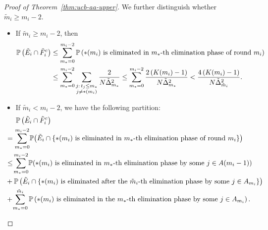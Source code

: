 \documentclass[
  12pt]{article}
\begin{document}
\begin{proof}[Proof of Theorem~\ref{thm:ucb-aa-upper}]
We further distinguish whether $\tilde{m}_i\geq m_i-2$.
\begin{itemize}
    \item If $\tilde{m}_i\geq m_i-2$, then
    \begin{align}
\mathbb{P}\left(\tilde{E}_i\cap\tilde{F}_i^c\right)&\leq  \sum_{m_*=0}^{m_i-2}\mathbb{P} \left(\text{$*(m_i)$ is eliminated in $m_*$-th elimination phase of round }m_i\right)\notag\\
&\leq \sum_{m_*=0}^{m_i-2}\sum_{\substack{j :\,t_j\leq m_*\\j\neq *(m_i)}}\frac{2}{N\tilde{\Delta}_{m_*}^2}\leq \sum_{m_*=0}^{m_i-2}\frac{2\left(K(m_i)-1\right)}{N\tilde{\Delta}_{m_*}^2}<\frac{4\left(K(m_i)-1\right)}{N\tilde{\Delta}_{\tilde{m}_i}^2}.
\label{eq: A-3 G-3 b2 upper bound, when tilde m big}
\end{align}
    \item If $\tilde{m}_i< m_i-2$, we have the following partition:
\begin{align}
&\mathbb{P}\left(\tilde{E}_i\cap\tilde{F}_i^c\right)\notag \\
   & \!\!\!\!\!\!\!\!\!=\sum_{m_*=0}^{m_i-2}\!\mathbb{P}\! \left(\tilde{E}_i\cap\left\{\text{$*(m_i)$ is eliminated in $m_*$-th elimination phase of round }m_i\right\}\right)\notag \\
    & \!\!\!\!\!\!\!\!\!\leq\!\sum_{m_*=0}^{m_i-2} \!\mathbb{P}\!\left(\text{$*(m_i)$ is eliminated in $m_*$-th elimination phase } \text{by some }j\in A(m_i-1)\right)\notag\\
    &\!\!\!\!\!\! \!\!\!+\mathbb{P}\left(\tilde{E}_i\cap\left\{\text{$*(m_i)$ is eliminated after the $\tilde{m}_i$-th elimination phase } \text{by some }j\in A_{m_i}\right\}\right)\notag\\
    & \!\!\!\!\!\! \!\!\!+\!\sum_{m_*=0}^{\tilde{m}_i}\mathbb{P}\left(\text{$*(m_i)$ is eliminated in the $m_*$-th elimination phase } \text{by some }j\in A_{m_i}\right).
    \label{eq: UCB-A3 G-3 b2 partition}
\end{align}
   

\end{itemize}
\end{proof}
\end{document}
